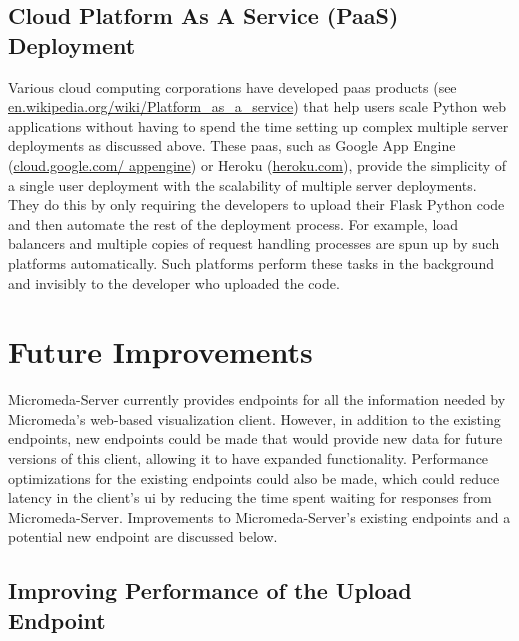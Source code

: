 \subsection{Cloud Platform As A Service (PaaS) Deployment}

Various cloud computing corporations have developed \gls{paas} \cite{lawton2008developing} products (see \href{http://en.wikipedia.org/wiki/Platform_as_a_service}{en.wikipedia.org/wiki/Platform\_as\_a\_service}) that help users scale Python web applications without having to spend the time setting up complex multiple server deployments as discussed above. These \gls{paas}, such as Google App Engine (\href{http://cloud.google.com/appengine}{cloud.google.com/ appengine}) or Heroku (\href{http://heroku.com}{heroku.com}), provide the simplicity of a single user deployment with the scalability of multiple server deployments. They do this by only requiring the developers to upload their Flask Python code and then automate the rest of the deployment process. For example, load balancers and multiple copies of request handling processes are spun up by such platforms automatically. Such platforms perform these tasks in the background and invisibly to the developer who uploaded the code.

\section{Future Improvements} \label{micromeda-server-improvements}

Micromeda-Server currently provides endpoints for all the information needed by Micromeda's web-based visualization client. However, in addition to the existing endpoints, new endpoints could be made that would provide new data for future versions of this client, allowing it to have expanded functionality. Performance optimizations for the existing endpoints could also be made, which could reduce latency in the client's \gls{ui} by reducing the time spent waiting for responses from Micromeda-Server. Improvements to Micromeda-Server's existing endpoints and a potential new endpoint are discussed below.

\subsection{Improving Performance of the Upload Endpoint}

